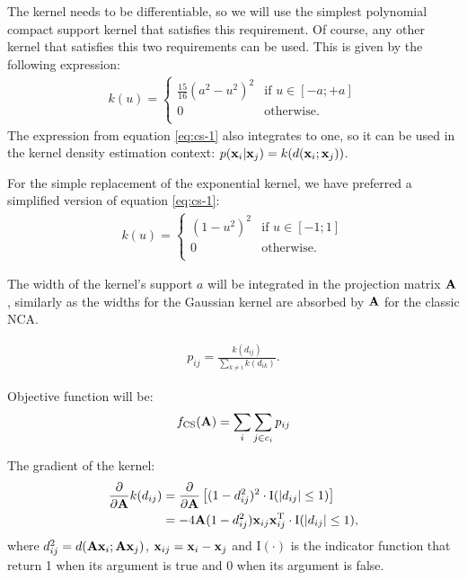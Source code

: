 The kernel needs to be differentiable, so we will use the simplest polynomial compact support kernel that satisfies this requirement. Of course, any other kernel that satisfies this two requirements can be used. This is given by the following expression:
\begin{align}
	k(u)=\begin{cases}
		\frac{15}{16}(a^2-u^2)^2& \mbox{if } u \in [-a;+a]\\
		0& \mbox{otherwise}.\\
	\end{cases}
	\label{eq:cs-1}
\end{align}
The expression from equation \ref{eq:cs-1} also integrates to one, so it can be used in the kernel density estimation context: $p(\mathbf{x}_i|\mathbf{x}_j) = k(d(\mathbf{x}_i;\mathbf{x}_j))$. 

For the simple replacement of the exponential kernel, we have preferred a simplified version of equation \ref{eq:cs-1}: 
	\begin{align}
		k(u)=\begin{cases}
				(1-u^2)^2& \mbox{if } u \in [-1;1]\\
				0& \mbox{otherwise}.\\
			\end{cases}
			\label{eq:cs-2}
	\end{align}
	
	The width of the kernel's support $a$ will be integrated in the projection matrix $\mathbf{A}$, similarly as the widths for the Gaussian kernel are absorbed by $\mathbf{A}$ for the classic NCA.

\begin{align}
	p_{ij} = \frac{k(d_{ij})}{\sum_{k\neq i} k(d_{ik})}.
\end{align}

Objective function will be: 
\begin{align}
	f_\text{CS}(\mathbf{A}) = \sum_{i}\sum_{j\in c_i} p_{ij}
\end{align}

The gradient of the kernel:
\begin{align}
	\frac{\partial}{\partial\mathbf{A}}k(d_{ij}) 
	&= 	\frac{\partial}{\partial\mathbf{A}}\left[(1-d_{ij}^2)^2\cdot\mathrm{I}(\left|d_{ij}\right|\le 1)\right]\\
	&= -4\mathbf{A}(1-d_{ij}^2)  \mathbf{x}_{ij} \mathbf{x}_{ij}^\mathrm{T} \cdot \mathrm{I}(\left|d_{ij}\right|\le 1),
\end{align}
where $d_{ij}^2 = d(\mathbf{A}\mathbf{x}_i;\mathbf{A}\mathbf{x}_j)$, $\mathbf{x}_{ij}=\mathbf{x}_i-\mathbf{x}_j$ and $\mathrm{I}(\cdot)$ is the indicator function that return 1 when its argument is true and 0 when its argument is false.

